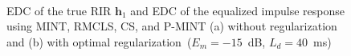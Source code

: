 \documentclass[draftcls,onecolumn,11pt]{IEEEtran}
\begin{document}
\begin{figure}[h]
\centering
\hbox{\hspace{-1.1cm}
}
\caption{EDC of the true RIR $\mathbf{h}_1$ and EDC of the equalized impulse response using MINT, RMCLS, CS, and P-MINT (a) without regularization and (b) with optimal regularization~($E_m = -15$~dB, $L_d = 40$~ms)}
\end{figure}
\end{document}
